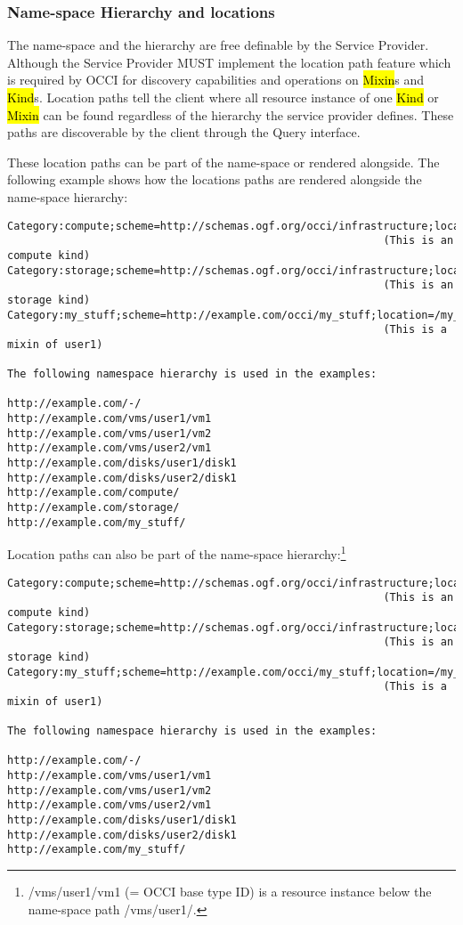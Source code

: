 \documentclass[10pt,a4paper]{article}
\begin{document}
\subsubsection{Name-space Hierarchy and locations}
The name-space and the hierarchy are free definable by the Service
Provider. Although the Service Provider MUST implement the location
path feature which is required by OCCI for discovery capabilities and
operations on \hl{Mixin}s and \hl{Kind}s. Location paths tell the
client where all resource instance of one \hl{Kind} or \hl{Mixin} can
be found regardless of the hierarchy the service provider
defines. These paths are discoverable by the client through the Query
interface.

These location paths can be part of the name-space or rendered
alongside. The following example shows how the locations paths are
rendered alongside the name-space hierarchy:

\begin{verbatim}
Category:compute;scheme=http://schemas.ogf.org/occi/infrastructure;location=/compute 
                                                           (This is an compute kind)
Category:storage;scheme=http://schemas.ogf.org/occi/infrastructure;location=/storage 
                                                           (This is an storage kind)
Category:my_stuff;scheme=http://example.com/occi/my_stuff;location=/my_stuff 
                                                           (This is a mixin of user1)

The following namespace hierarchy is used in the examples:

http://example.com/-/
http://example.com/vms/user1/vm1
http://example.com/vms/user1/vm2
http://example.com/vms/user2/vm1
http://example.com/disks/user1/disk1
http://example.com/disks/user2/disk1
http://example.com/compute/
http://example.com/storage/
http://example.com/my_stuff/
\end{verbatim}

Location paths can also be part of the name-space
hierarchy:\footnote{/vms/user1/vm1 (= OCCI base type ID) is a resource
  instance below the name-space path /vms/user1/.}

\begin{verbatim}
Category:compute;scheme=http://schemas.ogf.org/occi/infrastructure;location=/vms 
                                                           (This is an compute kind)
Category:storage;scheme=http://schemas.ogf.org/occi/infrastructure;location=/disks 
                                                           (This is an storage kind)
Category:my_stuff;scheme=http://example.com/occi/my_stuff;location=/my_stuff 
                                                           (This is a mixin of user1)

The following namespace hierarchy is used in the examples:

http://example.com/-/
http://example.com/vms/user1/vm1
http://example.com/vms/user1/vm2
http://example.com/vms/user2/vm1
http://example.com/disks/user1/disk1
http://example.com/disks/user2/disk1
http://example.com/my_stuff/
\end{verbatim}
\end{document}
